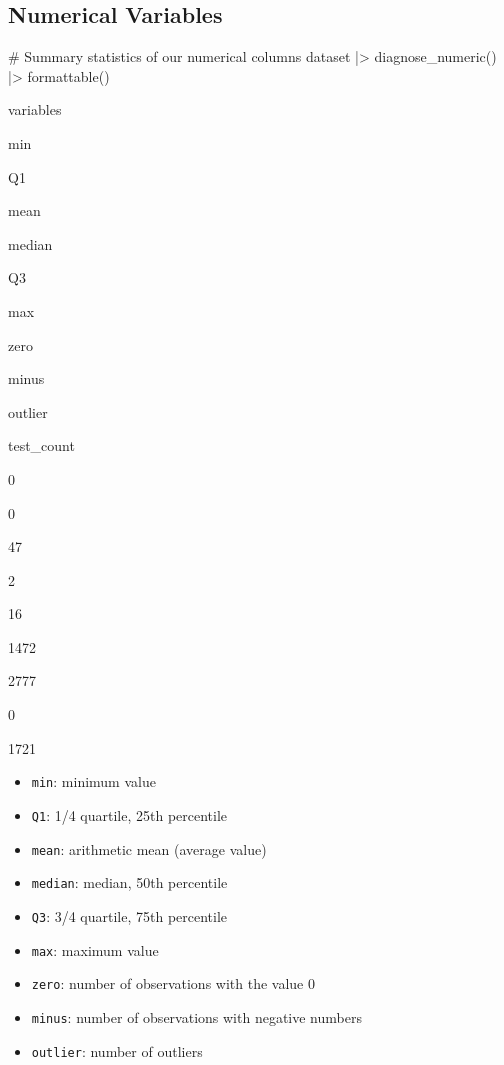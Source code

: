 \documentclass[
  letterpaper,
  DIV=11,
  numbers=noendperiod]{scrreprt}
\newenvironment{Shaded}{\begin{snugshade}}{\end{snugshade}}
\newcommand{\CommentTok}[1]{\textcolor[rgb]{0.37,0.37,0.37}{#1}}
\newcommand{\FunctionTok}[1]{\textcolor[rgb]{0.28,0.35,0.67}{#1}}
\newcommand{\NormalTok}[1]{\textcolor[rgb]{0.00,0.23,0.31}{#1}}
\newcommand{\SpecialCharTok}[1]{\textcolor[rgb]{0.37,0.37,0.37}{#1}}
\providecommand{\tightlist}{%
  \setlength{\itemsep}{0pt}\setlength{\parskip}{0pt}}\usepackage{longtable,booktabs,array}
\begin{document}
\hypertarget{numerical-variables}{%
\subsection{Numerical Variables}\label{numerical-variables}}

\begin{Shaded}
\begin{Highlighting}[]
\CommentTok{\# Summary statistics of our numerical columns}
\NormalTok{dataset }\SpecialCharTok{|\textgreater{}}
  \FunctionTok{diagnose\_numeric}\NormalTok{() }\SpecialCharTok{|\textgreater{}}
  \FunctionTok{formattable}\NormalTok{()}
\end{Highlighting}
\end{Shaded}

variables

min

Q1

mean

median

Q3

max

zero

minus

outlier

test\_count

0

0

47

2

16

1472

2777

0

1721

\begin{itemize}
\tightlist
\item
  \texttt{min}: minimum value
\item
  \texttt{Q1}: 1/4 quartile, 25th percentile
\item
  \texttt{mean}: arithmetic mean (average value)
\item
  \texttt{median}: median, 50th percentile
\item
  \texttt{Q3}: 3/4 quartile, 75th percentile
\item
  \texttt{max}: maximum value
\item
  \texttt{zero}: number of observations with the value 0
\item
  \texttt{minus}: number of observations with negative numbers
\item
  \texttt{outlier}: number of outliers
\end{itemize}
\end{document}
